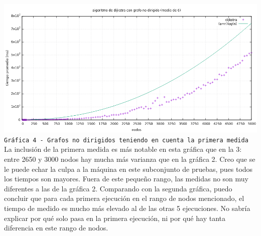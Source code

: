 \documentclass[12pt , a4paper]{article}
\begin{document}
	
	\newpage
	\hspace*{-.15\linewidth}
	\includegraphics[width=1.25\hsize]{nodir6.png}
	\texttt{Gráfica 4 - Grafos no dirigidos teniendo en cuenta la primera medida}
	La inclusión de la primera medida es más notable en esta gráfica que en la 3: entre 2650 y 3000 nodos hay mucha más varianza que en la gráfica 2. Creo que se le puede echar la culpa a la máquina en este subconjunto de pruebas, pues todos los tiempos son mayores. Fuera de este pequeño rango, las medidas no son muy diferentes a las de la gráfica 2.
	Comparando con la segunda gráfica, puedo concluir que para cada primera ejecución en el rango de nodos mencionado, el tiempo de medido es mucho más elevado al de las otras 5 ejecuciones. No sabría explicar por qué solo pasa en la primera ejecución, ni por qué hay tanta diferencia en este rango de nodos.
\end{document}
